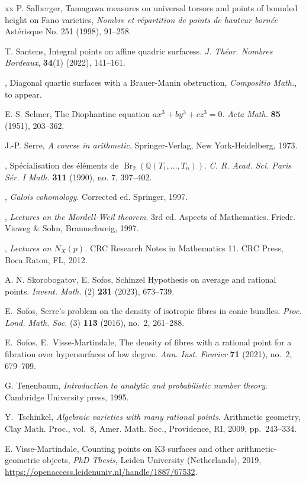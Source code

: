 \documentclass[a4paper,12pt,reqno]{amsart}
\numberwithin{equation}{section} \numberwithin{figure}{section}
\DeclareMathOperator{\Br}{Br} \DeclareMathOperator{\Brnr}{Br_{nr}}
\newcommand\Q{\mathbb{Q}}
\renewcommand{\#}{\sharp}
\theoremstyle{definition}
\numberwithin{lemma}{section}
\begin{document}
\begin{thebibliography}{xx}
P. Salberger,
Tamagawa measures on universal torsors and points of bounded height on Fano varieties,
\emph{Nombre et répartition de points de hauteur bornée} Astérisque No. 251 (1998), 91--258. 
 
{T. Santens}, 
{Integral points on affine quadric surfacess}.
\emph{J. Th\'{e}or. Nombres Bordeaux}, {\bf 34}(1) (2022), 141--161.

{\bysame},
Diagonal quartic surfaces with a Brauer-Manin obstruction,
\emph{Compositio Math.}, to appear.

{E. S. Selmer}, 
{The Diophantine equation $ax^3+by^3+cz^3=0$}.
\textit{Acta Math.} \textbf{85} (1951), 203--362.

J.-P. Serre, \emph{A course in arithmetic}, Springer-Verlag, New
  York-Heidelberg, 1973.
  
\bysame, %
{Sp\'{e}cialisation des \'{e}l\'{e}ments de $\Br_2(\Q(T_1,\ldots,T_n))$}.
\emph{C. R. Acad. Sci. Paris S\'{e}r. I Math.} {\bf311} (1990), no. 7, 397--402.

\bysame, %
 \textit{Galois cohomology}.
Corrected ed. Springer, 1997.

\bysame, \emph{Lectures on the Mordell-Weil theorem}.
3rd ed.  Aspects of Mathematics. Friedr. Vieweg \& Sohn, Braunschweig, 1997.

\bysame, \emph{Lectures on $N_X(p)$.}  CRC Research Notes in Mathematics 11. CRC Press, Boca Raton, FL, 2012.

{A. N. Skorobogatov, E. Sofos},
Schinzel {H}ypothesis on average and rational points.
\emph{Invent. Math.} (2) \textbf{231} (2023), 673--739.




 

E.~Sofos, 
Serre's problem on the density of isotropic fibres in conic bundles.
\emph{Proc. Lond. Math. Soc.} (3) \textbf{113} (2016), no.~2, 261--288.

E.~Sofos, E.~Visse-Martindale, 
The density of fibres with a rational point for a fibration over hypersurfaces of low degree.
\emph{Ann. Inst. Fourier} \textbf{71} (2021), no.~2, 679--709.

{G. Tenenbaum}, 
\textit{Introduction to analytic and probabilistic number theory}. 
Cambridge University press, 1995.

Y.~Tschinkel, \emph{Algebraic varieties with many rational points}. Arithmetic
  geometry, Clay Math. Proc., vol.~8, Amer. Math. Soc., Providence, RI, 2009,
  pp.~243--334.


{E. Visse-Martindale},
Counting points on K3 surfaces and other arithmetic- geometric objects,
\emph{PhD Thesis}, Leiden University (Netherlands), 2019,
\url{https://openaccess.leidenuniv.nl/handle/1887/67532}.


\end{thebibliography}
\end{document}
